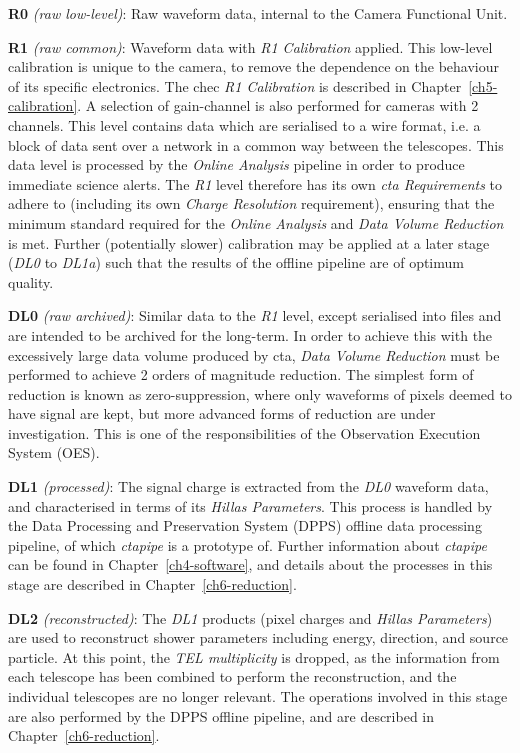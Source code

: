 \textbf{R0} \textit{(raw low-level)}:
Raw waveform data, internal to the Camera Functional Unit.

\textbf{R1} \textit{(raw common)}:
Waveform data with \textit{R1 Calibration} applied. This low-level calibration is unique to the camera, to remove the dependence on the behaviour of its specific electronics. The \gls{chec} \textit{R1 Calibration} is described in Chapter~\ref{ch5-calibration}. A selection of gain-channel is also performed for cameras with 2 channels. This level contains data which are serialised to a wire format, i.e. a block of data sent over a network in a common way between the telescopes. This data level is processed by the \textit{Online Analysis} pipeline in order to produce immediate science alerts. The \textit{R1} level therefore has its own \textit{\gls{cta} Requirements} to adhere to (including its own \textit{Charge Resolution} requirement), ensuring that the minimum standard required for the \textit{Online Analysis} and \textit{Data Volume Reduction} is met. Further (potentially slower) calibration may be applied at a later stage (\textit{DL0} to \textit{DL1a}) such that the results of the offline pipeline are of optimum quality.

\textbf{DL0} \textit{(raw archived)}: Similar data to the \textit{R1} level, except serialised into files and are intended to be archived for the long-term. In order to achieve this with the excessively large data volume produced by \gls{cta}, \textit{Data Volume Reduction} must be performed to achieve 2 orders of magnitude reduction. The simplest form of reduction is known as zero-suppression, where only waveforms of pixels deemed to have signal are kept, but more advanced forms of reduction are under investigation. This is one of the responsibilities of the Observation Execution System (OES).

\textbf{DL1} \textit{(processed)}: The signal charge is extracted from the \textit{DL0} waveform data, and characterised in terms of its \textit{Hillas Parameters}. This process is handled by the Data Processing and Preservation System (DPPS) offline data processing pipeline, of which \textit{ctapipe} is a prototype of. Further information about \textit{ctapipe} can be found in Chapter~\ref{ch4-software}, and details about the processes in this stage are described in Chapter~\ref{ch6-reduction}.

\textbf{DL2} \textit{(reconstructed)}: The \textit{DL1} products (pixel charges and \textit{Hillas Parameters}) are used to reconstruct shower parameters including energy, direction, and source particle. At this point, the \textit{TEL multiplicity} is dropped, as the information from each telescope has been combined to perform the reconstruction, and the individual telescopes are no longer relevant. The operations involved in this stage are also performed by the DPPS offline pipeline, and are described in Chapter~\ref{ch6-reduction}.


